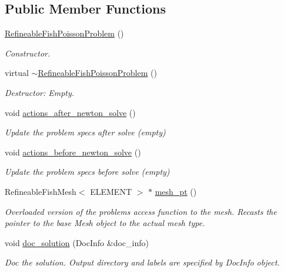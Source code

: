 \subsection*{Public Member Functions}
\begin{DoxyCompactItemize}
\item 
\hyperlink{classRefineableFishPoissonProblem_a7a9c8258a867de6b3c8b9d00a7c965f1}{Refineable\+Fish\+Poisson\+Problem} ()
\begin{DoxyCompactList}\small\item\em Constructor. \end{DoxyCompactList}\item 
virtual \hyperlink{classRefineableFishPoissonProblem_a4a5e7c5f264364211ad641353933c222}{$\sim$\+Refineable\+Fish\+Poisson\+Problem} ()
\begin{DoxyCompactList}\small\item\em Destructor\+: Empty. \end{DoxyCompactList}\item 
void \hyperlink{classRefineableFishPoissonProblem_a7f6c356f7c8bd0130de957297e999f40}{actions\+\_\+after\+\_\+newton\+\_\+solve} ()
\begin{DoxyCompactList}\small\item\em Update the problem specs after solve (empty) \end{DoxyCompactList}\item 
void \hyperlink{classRefineableFishPoissonProblem_a58098181f3b88c2fc65f24fb15c1a529}{actions\+\_\+before\+\_\+newton\+\_\+solve} ()
\begin{DoxyCompactList}\small\item\em Update the problem specs before solve (empty) \end{DoxyCompactList}\item 
Refineable\+Fish\+Mesh$<$ E\+L\+E\+M\+E\+NT $>$ $\ast$ \hyperlink{classRefineableFishPoissonProblem_a803c9050b07b35aba22f08a5a9e59f2c}{mesh\+\_\+pt} ()
\begin{DoxyCompactList}\small\item\em Overloaded version of the problem\textquotesingle{}s access function to the mesh. Recasts the pointer to the base Mesh object to the actual mesh type. \end{DoxyCompactList}\item 
void \hyperlink{classRefineableFishPoissonProblem_aeee1bf23216971b50b8822c45e62c48b}{doc\+\_\+solution} (Doc\+Info \&doc\+\_\+info)
\begin{DoxyCompactList}\small\item\em Doc the solution. Output directory and labels are specified by Doc\+Info object. \end{DoxyCompactList}\end{DoxyCompactItemize}


